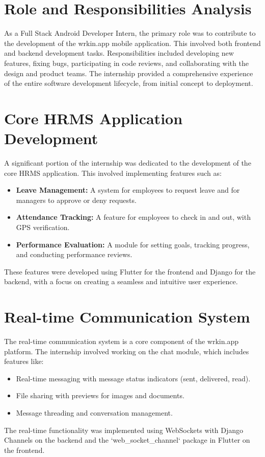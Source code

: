 \section{Role and Responsibilities Analysis}
As a Full Stack Android Developer Intern, the primary role was to contribute to the development of the wrkin.app mobile application. This involved both frontend and backend development tasks. Responsibilities included developing new features, fixing bugs, participating in code reviews, and collaborating with the design and product teams. The internship provided a comprehensive experience of the entire software development lifecycle, from initial concept to deployment.

\section{Core HRMS Application Development}
A significant portion of the internship was dedicated to the development of the core HRMS application. This involved implementing features such as:
\begin{itemize}
    \item \textbf{Leave Management:} A system for employees to request leave and for managers to approve or deny requests.
    \item \textbf{Attendance Tracking:} A feature for employees to check in and out, with GPS verification.
    \item \textbf{Performance Evaluation:} A module for setting goals, tracking progress, and conducting performance reviews.
\end{itemize}
These features were developed using Flutter for the frontend and Django for the backend, with a focus on creating a seamless and intuitive user experience.

\section{Real-time Communication System}
The real-time communication system is a core component of the wrkin.app platform. The internship involved working on the chat module, which includes features like:
\begin{itemize}
    \item Real-time messaging with message status indicators (sent, delivered, read).
    \item File sharing with previews for images and documents.
    \item Message threading and conversation management.
\end{itemize}
The real-time functionality was implemented using WebSockets with Django Channels on the backend and the `web_socket_channel` package in Flutter on the frontend.

